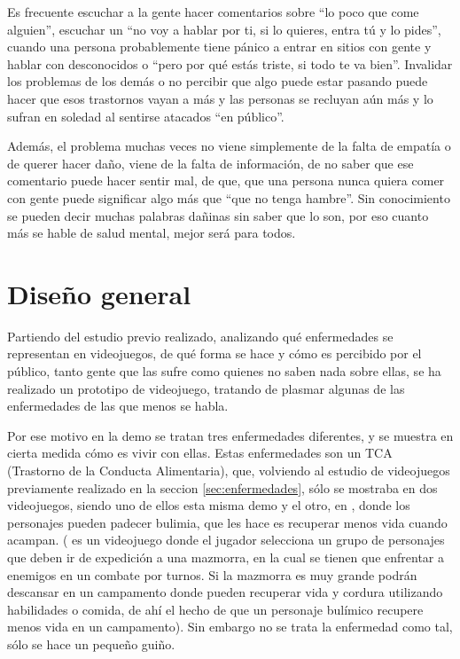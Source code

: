 \documentclass[12pt, a4paper,twoside,titlepage]{book}
\begin{document}
Es frecuente escuchar a la gente hacer comentarios sobre ``lo poco que come alguien'', escuchar un ``no voy a hablar por ti, si lo quieres, entra tú y lo pides'', cuando una persona probablemente tiene pánico a entrar en sitios con gente y hablar con desconocidos o ``pero por qué estás triste, si todo te va bien''. Invalidar los problemas de los demás o no percibir que algo puede estar pasando puede hacer que esos trastornos vayan a más y las personas se recluyan aún más y lo sufran en soledad al sentirse atacados ``en público''. 

Además, el problema muchas veces no viene simplemente de la falta de empatía o de querer hacer daño, viene de la falta de información, de no saber que ese comentario puede hacer sentir mal, de que, que una persona nunca quiera comer con gente puede significar algo más que ``que no tenga hambre''. Sin conocimiento se pueden decir muchas palabras dañinas sin saber que lo son, por eso cuanto más se hable de salud mental, mejor será para todos. 

\label{sec:diseño}
\section{Diseño general}
Partiendo del estudio previo realizado, analizando qué enfermedades se representan en videojuegos, de qué forma se hace y cómo es percibido por el público, tanto gente que las sufre como quienes no saben nada sobre ellas, se ha realizado un prototipo de videojuego, tratando de plasmar algunas de las enfermedades de las que menos se habla. 

Por ese motivo en la demo se tratan tres enfermedades diferentes, y se muestra en cierta medida cómo es vivir con ellas. Estas enfermedades son un TCA (Trastorno de la Conducta Alimentaria), que, volviendo al estudio de videojuegos previamente realizado en la seccion \ref{sec:enfermedades}, sólo se mostraba en dos videojuegos, siendo uno de ellos esta misma demo y el otro, en , donde los personajes pueden padecer bulimia, que les hace es recuperar menos vida cuando acampan. ( es un videojuego donde el jugador selecciona un grupo de personajes que deben ir de expedición a una mazmorra, en la cual se tienen que enfrentar a enemigos en un combate por turnos. Si la mazmorra es muy grande podrán descansar en un campamento donde pueden recuperar vida y cordura utilizando habilidades o comida, de ahí el hecho de que un personaje bulímico recupere menos vida en un campamento). Sin embargo no se trata la enfermedad como tal, sólo se hace un pequeño guiño. 
\end{document}
